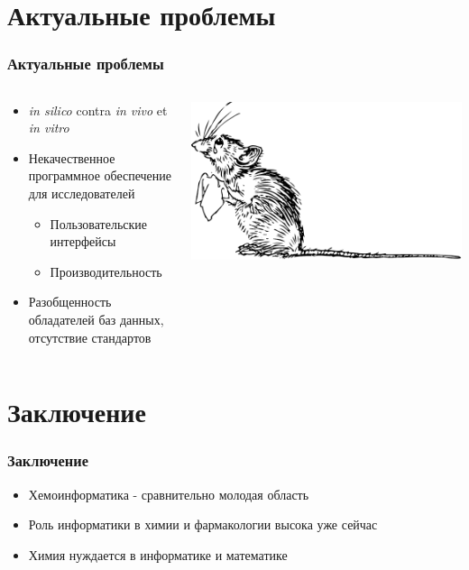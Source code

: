 \section{Актуальные проблемы}
\begin{frame}
  \frametitle{Актуальные проблемы}
  \begin{columns}
    \begin{column}{0.7\textwidth}
  \begin{itemize}
    \item \emph{in silico} contra \emph{in vivo} et \emph{in vitro}
    \item Некачественное программное обеспечение для исследователей
      \begin{itemize}
        \item Пользовательские интерфейсы
        \item Производительность
      \end{itemize}
    \item Разобщенность обладателей баз данных, отсутствие стандартов 
  \end{itemize}
   \end{column}
   \begin{column}{0.2\textwidth}
     \includegraphics[scale=0.5]{images/mouse.pdf}
   \end{column}
   \end{columns}
\end{frame}

\section{Заключение}
\begin{frame}
  \frametitle{Заключение}
  \begin{itemize}
    \item Хемоинформатика - сравнительно молодая область
    \item Роль информатики в химии и фармакологии высока уже сейчас 
    \item Химия нуждается в информатике и математике
  \end{itemize}
\end{frame}

